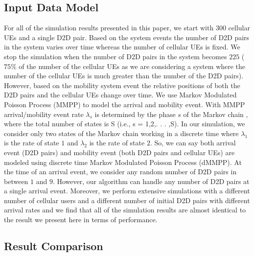 \documentclass[times]{dacauth}
\begin{document}
\subsection{Input Data Model}

\noindent


\noindent
For all of the simulation results presented in this paper, we start with $300$ cellular UEs and a single D2D pair. Based on the system events the number of D2D pairs in the system varies over time whereas the number of cellular UEs is fixed. We stop the simulation when the number of D2D pairs in the system becomes $225$ ( $75\%$ of the number of the cellular UEs as we are considering a system where the number of the cellular UEs is much greater than the number of the D2D pairs). However, based on the mobility system event the relative positions of both the D2D pairs and the cellular UEs change over time. We use Markov Modulated Poisson Process (MMPP)\cite{salvador2003multiscale} to model the arrival and mobility event. With MMPP arrival/mobility event rate $\lambda_s$ is determined by the phase $s$ of the Markov chain \cite{stewart1994introduction}, where the total number of states is S (i.e., s = 1,2,. . . ,S). In our simulation, we consider only two states of the Markov chain working in a discrete time where $\lambda_1$ is the rate of state $1$ and $\lambda_2$ is the rate of state $2$. So, we can say both arrival event (D2D pairs) and mobility event (both D2D pairs and cellular UEs) are modeled using discrete time Markov Modulated Poisson Process (dMMPP). At the time of an arrival event, we consider any random number of D2D pairs in between $1$ and $9$. However, our algorithm can handle any number of D2D pairs at a single arrival event. Moreover, we perform extensive simulations with a different number of cellular users and a different number of initial D2D pairs with different arrival rates and we find that all of the simulation results are almost identical to the result we present here in terms of performance.

\noindent


\subsection{Result Comparison}
\end{document}
